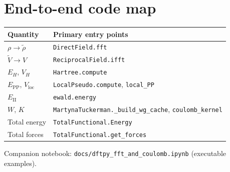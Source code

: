 \documentclass[11pt,a4paper]{article}
\begin{document}
\section{End-to-end code map}

\begin{center}
\begin{tabular}{@{}ll@{}}
\toprule
Quantity & Primary entry points \\
\midrule
$\rho\to\tilde\rho$ & \texttt{DirectField.fft} \\
$\tilde V\to V$ & \texttt{ReciprocalField.ifft} \\
$E_H$, $V_H$ & \texttt{Hartree.compute} \\
$E_{\mathrm{PP}}$, $V_{\mathrm{loc}}$ & \texttt{LocalPseudo.compute}, \texttt{local\_PP} \\
$E_{\mathrm{II}}$ & \texttt{ewald.energy} \\
$W$, $K$ & \texttt{MartynaTuckerman.\_build\_wg\_cache}, \texttt{coulomb\_kernel} \\
Total energy & \texttt{TotalFunctional.Energy} \\
Total forces & \texttt{TotalFunctional.get\_forces} \\
\bottomrule
\end{tabular}
\end{center}

Companion notebook: \texttt{docs/dftpy\_fft\_and\_coulomb.ipynb} (executable examples).
\end{document}
